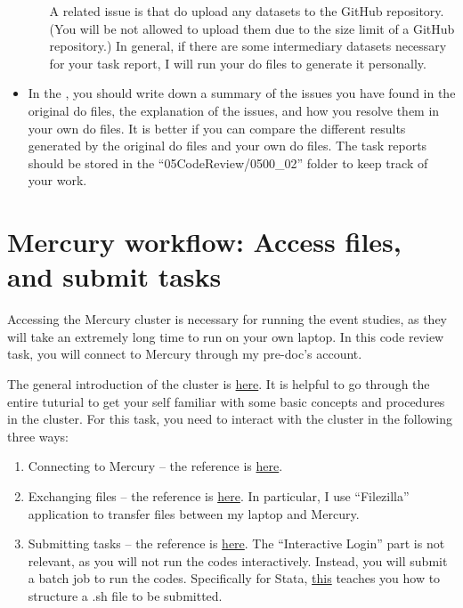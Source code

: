 \documentclass[12pt]{article}
\newcommand{\highlightP}[1]{{\emph{\color{MyPink}{#1}}}}
\theoremstyle{definition}
\begin{document}
\begin{itemize}[topsep=0pt, leftmargin=20pt, itemsep=0pt]
\begin{itemize}[topsep=0pt, leftmargin=22pt, itemsep=0pt]
        A related issue is that do \highlightP{not} upload any datasets to the GitHub repository. (You will be not allowed to upload them due to the size limit of a GitHub repository.) In general, if there are some intermediary datasets necessary for your task report, I will run your do files to generate it personally. 
    \end{itemize}
    
    \item In the \highlightP{task report}, you should write down a summary of the issues you have found in the original do files, the explanation of the issues, and how you resolve them in your own do files. It is better if you can compare the different results generated by the original do files and your own do files. The task reports should be stored in the ``05CodeReview/0500\_02'' folder to keep track of your work.
\end{itemize}

\section{Mercury workflow: Access files, and submit tasks}

Accessing the Mercury cluster is necessary for running the event studies, as they will take an extremely long time to run on your own laptop. In this code review task, you will connect to Mercury through my pre-doc's account. 

The general introduction of the cluster is \href{https://hpc-docs.chicagobooth.edu/intro.html}{here}. It is helpful to go through the entire tuturial to get your self familiar with some basic concepts and procedures in the cluster. For this task, you need to interact with the cluster in the following three ways:
\begin{enumerate}[topsep=0pt, leftmargin=20pt, itemsep=0pt, label=(\alph*)]
	\setlength{\parskip}{10pt} 
    \item Connecting to Mercury -- the reference is \href{https://hpc-docs.chicagobooth.edu/connecting.html#}{here}.
	\item Exchanging files -- the reference is \href{https://hpc-docs.chicagobooth.edu/accessing.html}{here}. In particular, I use ``Filezilla'' application to transfer files between my laptop and Mercury.
	\item Submitting tasks -- the reference is \href{https://hpc-docs.chicagobooth.edu/running.html}{here}. The ``Interactive Login'' part is not relevant, as you will not run the codes interactively. Instead, you will submit a batch job to run the codes.
    Specifically for Stata, \href{https://hpc-docs.chicagobooth.edu/Stata/stata.html#batch-mode}{this} teaches you how to structure a .sh file to be submitted.
\end{enumerate}
\end{document}
